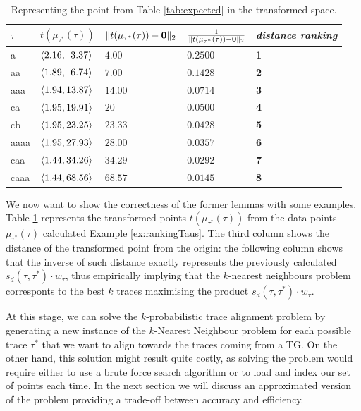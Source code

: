 \begin{table}[!t]
\centering
\caption{Representing the point from Table \ref{tab:expected} in the transformed space.}\label{tab:transf}
\begin{tabular}{ll|lll}
	\toprule
	
	$\tau$ & $t(\mu_{\tau^*}(\tau))$ & $\norm{t(\mu_{\tau^*}(\tau))-\vec{0}}{2}$ & $\frac{1}{\norm{t(\mu_{\tau^*}(\tau))-\vec{0}}{2}}$ & \textit{distance ranking}\\
	
	\midrule	
	a   & $\braket{2.16, \;\,3.37}$ & $4.00$ & $0.2500$ & \textbf{1}\\
	{aa}  & $\braket{1.89, \;\,6.74}$ & $7.00$ & $0.1428$ & \textbf{2}\\
	aaa   & $\braket{1.94, 13.87}$ & $14.00$ & $0.0714$ & \textbf{3}\\
	ca   & $\braket{1.95, 19.91}$ & $20$ & $0.0500$ & \textbf{4}\\
	{cb}  & $\braket{1.95, 23.25}$ & $23.33$ & $0.0428$ & \textbf{5}\\
aaaa   & $\braket{1.95, 27.93}$ & $28.00$ & $0.0357$ & \textbf{6}\\
caa   & $\braket{1.44, 34.26}$ & $34.29$ & $0.0292$ & \textbf{7}\\
caaa   & $\braket{1.44, 68.56}$ & $68.57$ & $0.0145$ & \textbf{8}\\
	\bottomrule
\end{tabular}
\end{table}
\begin{example}
We now want to show the correctness of the former lemmas with some examples.
Table \ref{tab:transf} represents the transformed points $t(\mu_{\tau^*}(\tau))$ from the data points $\mu_{\tau^*}(\tau)$  calculated  Example \ref{ex:rankingTaus}. The third column shows the distance of the transformed point from the origin: the following column shows that the inverse of such distance exactly represents the previously calculated $s_d(\tau,\tau^*)\cdot w_\tau$, thus empirically implying that the $k$-nearest neighbours problem corresponts to the best $k$ traces maximising the product $s_d(\tau,\tau^*)\cdot w_\tau$.
\end{example}





At this stage, we can solve the $k$-probabilistic trace alignment problem by generating a new instance of the $k$-Nearest Neighbour problem for each possible trace $\tau^*$ that we want to align towards the traces coming from a TG. On the other hand, this solution might result quite costly, as solving the problem would require either to use a brute force search algorithm or to load and index our set of points each time. In the next section we will discuss an approximated version of the problem providing a trade-off between accuracy and efficiency.


